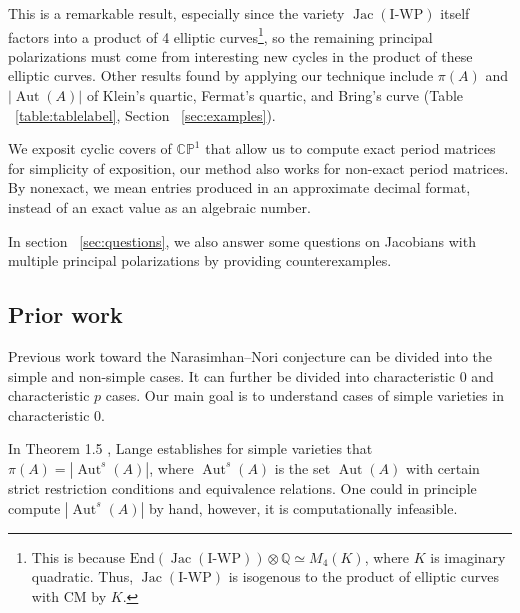 \documentclass[12pt,reqno]{amsart}
\DeclareMathOperator{\Aut}{Aut}
\DeclareMathOperator{\Jac}{Jac}
\newcommand{\C}{\mathbb{C}}
\newcommand{\Q}{\mathbb{Q}}
\renewcommand{\P}{\mathbb{P}}
\theoremstyle{definition}
\theoremstyle{remark}
\newtheorem*{remark}{Remark}
\begin{document}
This is a remarkable result, especially since the variety $\Jac(\text{I-WP})$ itself factors into a product of 4 elliptic curves\footnote{This is because $\text{End}(\Jac(\text{I-WP})) \otimes \Q \simeq M_4(K)$, where $K$ is imaginary quadratic. Thus, $\Jac(\text{I-WP})$ is isogenous to the product of elliptic curves with CM by $K$.}, so the remaining principal polarizations must come from interesting new cycles in the product of these elliptic curves. Other results found by applying our technique include $\pi(A)$ and $|\Aut(A)|$ of Klein's quartic, Fermat's quartic, and Bring's curve (Table ~\ref{table:tablelabel}, Section ~\ref{sec:examples}).

We exposit cyclic covers of $\C\P^1$ that allow us to compute exact period matrices for simplicity of exposition, our method also works for non-exact period matrices. By nonexact, we mean entries produced in an approximate decimal format, instead of an exact value as an algebraic number.

In section ~\ref{sec:questions}, we also answer some questions on Jacobians with multiple principal polarizations by providing counterexamples.

\subsection{Prior work}
\label{sec:prior}
Previous work toward the Narasimhan--Nori conjecture can be divided into the simple and non-simple cases. %
It can further be divided into characteristic 0 and characteristic $p$ cases. Our main goal is to understand cases of simple varieties in characteristic 0. 

In Theorem 1.5 \cite{several}, Lange establishes for simple varieties that $\pi(A) = |\Aut^s(A)|$, where $\Aut^s(A)$ is the set $\Aut(A)$ with certain strict restriction conditions and equivalence relations. One could in principle compute $|\Aut^s(A)|$ by hand, however, it is computationally infeasible. 

\end{document}
